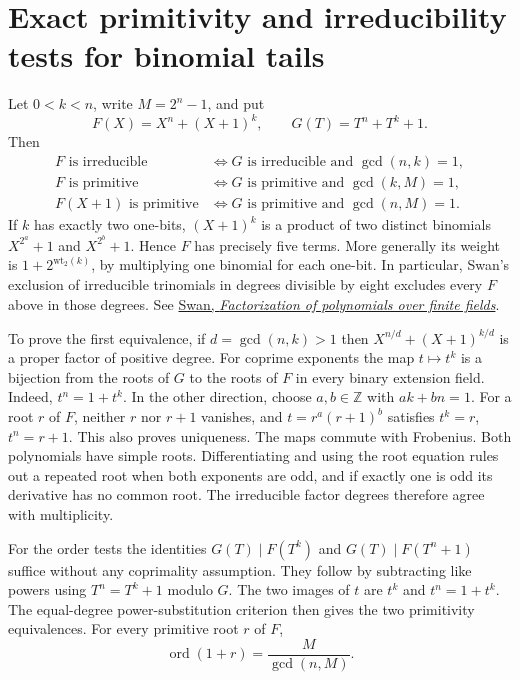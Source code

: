 \documentclass[11pt]{article}
\newcommand{\ord}{\operatorname{ord}}
\begin{document}
\section{Exact primitivity and irreducibility tests for binomial tails}
\label{sec:binomial-tail}
Let \(0<k<n\), write \(M=2^n-1\), and put
\[
 F(X)=X^n+(X+1)^k,\qquad G(T)=T^n+T^k+1 .
\]
Then
\begin{align*}
 F\text{ is irreducible}
    &\iff G\text{ is irreducible and }\gcd(n,k)=1,\\
 F\text{ is primitive}
    &\iff G\text{ is primitive and }\gcd(k,M)=1,\\
 F(X+1)\text{ is primitive}
    &\iff G\text{ is primitive and }\gcd(n,M)=1 .
\end{align*}
If \(k\) has exactly two one-bits, \((X+1)^k\) is a product of
two distinct binomials \(X^{2^a}+1\) and \(X^{2^b}+1\).
Hence \(F\) has precisely five terms. More generally its weight
is \(1+2^{\mathrm{wt}_2(k)}\), by multiplying one binomial for
each one-bit. In particular, Swan's exclusion of irreducible
trinomials in degrees divisible by eight excludes every \(F\) above
in those degrees. See
\href{https://doi.org/10.2140/pjm.1962.12.1099}{Swan, \emph{Factorization of polynomials over finite fields}}.

To prove the first equivalence, if \(d=\gcd(n,k)>1\) then
\(X^{n/d}+(X+1)^{k/d}\) is a proper factor of positive degree.
For coprime exponents the map \(t\mapsto t^k\) is a bijection
from the roots of \(G\) to the roots of \(F\) in every binary
extension field. Indeed, \(t^n=1+t^k\).
In the other direction, choose \(a,b\in\mathbb Z\) with \(ak+bn=1\).
For a root \(r\) of \(F\), neither \(r\) nor \(r+1\) vanishes,
and \(t=r^a(r+1)^b\) satisfies \(t^k=r\), \(t^n=r+1\).
This also proves uniqueness. The maps commute with Frobenius.
Both polynomials have simple roots. Differentiating and using the
root equation rules out a repeated root when both exponents are odd,
and if exactly one is odd its derivative has no common root.
The irreducible factor degrees therefore agree with multiplicity.

For the order tests the identities \(G(T)\mid F(T^k)\) and
\(G(T)\mid F(T^n+1)\) suffice without any coprimality assumption.
They follow by subtracting like powers using \(T^n=T^k+1\) modulo \(G\).
The two images of \(t\) are \(t^k\) and \(t^n=1+t^k\).
The equal-degree power-substitution criterion then gives the two
primitivity equivalences. For every primitive root \(r\) of \(F\),
\[
                   \ord(1+r)=\frac{M}{\gcd(n,M)}.
\]
\end{document}
